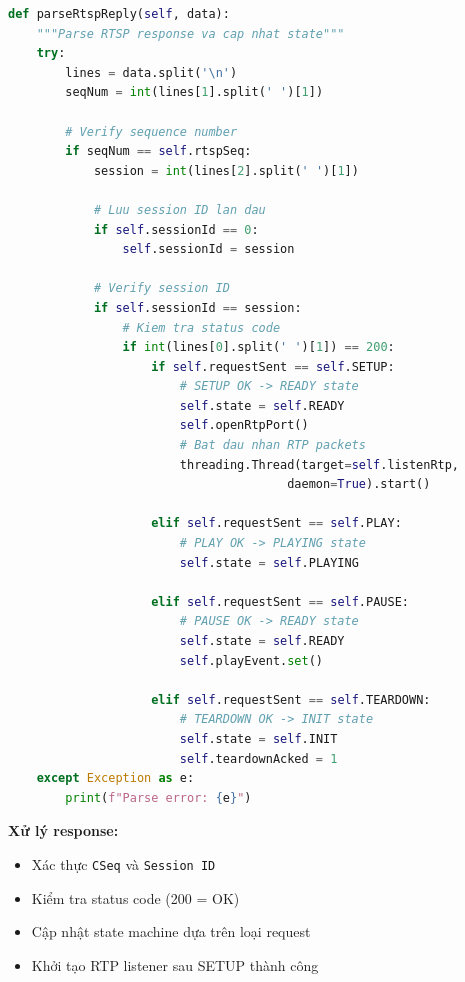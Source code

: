 \begin{lstlisting}[language=Python, caption={Parse RTSP Response}]
def parseRtspReply(self, data):
    """Parse RTSP response va cap nhat state"""
    try:
        lines = data.split('\n')
        seqNum = int(lines[1].split(' ')[1])
        
        # Verify sequence number
        if seqNum == self.rtspSeq:
            session = int(lines[2].split(' ')[1])
            
            # Luu session ID lan dau
            if self.sessionId == 0:
                self.sessionId = session
            
            # Verify session ID
            if self.sessionId == session:
                # Kiem tra status code
                if int(lines[0].split(' ')[1]) == 200:
                    if self.requestSent == self.SETUP:
                        # SETUP OK -> READY state
                        self.state = self.READY
                        self.openRtpPort()
                        # Bat dau nhan RTP packets
                        threading.Thread(target=self.listenRtp, 
                                       daemon=True).start()
                        
                    elif self.requestSent == self.PLAY:
                        # PLAY OK -> PLAYING state
                        self.state = self.PLAYING
                        
                    elif self.requestSent == self.PAUSE:
                        # PAUSE OK -> READY state
                        self.state = self.READY
                        self.playEvent.set()
                        
                    elif self.requestSent == self.TEARDOWN:
                        # TEARDOWN OK -> INIT state
                        self.state = self.INIT
                        self.teardownAcked = 1
    except Exception as e:
        print(f"Parse error: {e}")
\end{lstlisting}

\textbf{Xử lý response:}
\begin{itemize}
    \item Xác thực \texttt{CSeq} và \texttt{Session ID}
    \item Kiểm tra status code (200 = OK)
    \item Cập nhật state machine dựa trên loại request
    \item Khởi tạo RTP listener sau SETUP thành công
\end{itemize}

